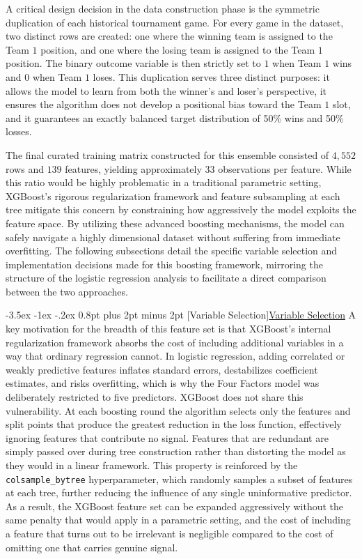 \documentclass[12pt,leqno]{article}\usepackage[pdftex]{graphicx}\usepackage[dvipsnames]{xcolor}
\makeatletter
\renewcommand\subsubsection{\@startsection {subsubsection}{1}{\z@}%
{-3.5ex \@plus -1ex \@minus -.2ex}%
{0.8pt plus 2pt minus 2pt}%
{\normalfont}}
\newcommand{\usubsubsection}[1]{\subsubsection[#1]{\normalfont\normalfont\underline{#1}}}%
\theoremstyle{remark}
\makeatother
\begin{document}
A critical design decision in the data construction phase is the symmetric duplication of each historical tournament game. For every game in the dataset, two distinct rows are created: one where the winning team is assigned to the Team $1$ position, and one where the losing team is assigned to the Team $1$ position. The binary outcome variable is then strictly set to $1$ when Team $1$ wins and $0$ when Team $1$ loses. This duplication serves three distinct purposes: it allows the model to learn from both the winner's and loser's perspective, it ensures the algorithm does not develop a positional bias toward the Team $1$ slot, and it guarantees an exactly balanced target distribution of 50\% wins and 50\% losses.

The final curated training matrix constructed for this ensemble consisted of $4,552$ rows and $139$ features, yielding approximately $33$ observations per feature. While this ratio would be highly problematic in a traditional parametric setting, XGBoost's rigorous regularization framework and feature subsampling at each tree mitigate this concern by constraining how aggressively the model exploits the feature space. By utilizing these advanced boosting mechanisms, the model can safely navigate a highly dimensional dataset without suffering from immediate overfitting. The following subsections detail the specific variable selection and implementation decisions made for this boosting framework, mirroring the structure of the logistic regression analysis to facilitate a direct comparison between the two approaches.

\usubsubsection{Variable Selection}
A key motivation for the breadth of this feature set is that XGBoost's internal regularization framework absorbs the cost of including additional variables in a way that ordinary regression cannot. In logistic regression, adding correlated or weakly predictive features inflates standard errors, destabilizes coefficient estimates, and risks overfitting, which is why the Four Factors model was deliberately restricted to five predictors. XGBoost does not share this vulnerability. At each boosting round the algorithm selects only the features and split points that produce the greatest reduction in the loss function, effectively ignoring features that contribute no signal. Features that are redundant are simply passed over during tree construction rather than distorting the model as they would in a linear framework. This property is reinforced by the \texttt{colsample\_bytree} hyperparameter, which randomly samples a subset of features at each tree, further reducing the influence of any single uninformative predictor. As a result, the XGBoost feature set can be expanded aggressively without the same penalty that would apply in a parametric setting, and the cost of including a feature that turns out to be irrelevant is negligible compared to the cost of omitting one that carries genuine signal.
\end{document}
